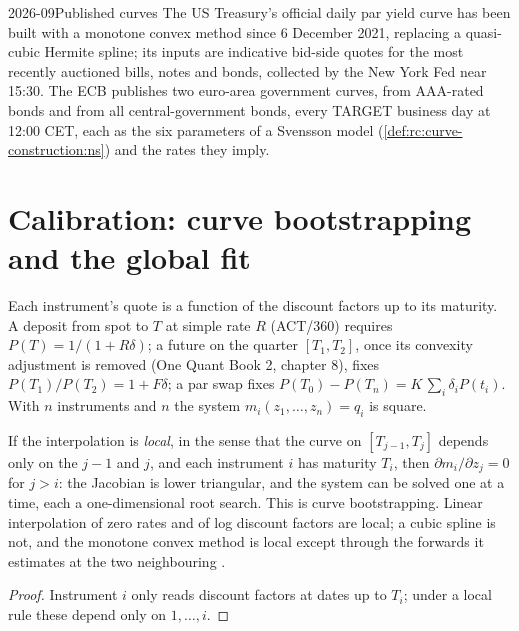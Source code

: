 \begin{dated}{2026-09}{Published curves}\label{dat:rc:curve-construction:published}
The US Treasury's official daily par yield curve has been built with a
monotone convex method since 6 December 2021, replacing a quasi-cubic Hermite
spline; its inputs are indicative bid-side quotes for the most recently
auctioned bills, notes and bonds, collected by the New York Fed near 15:30.
The ECB publishes two euro-area government curves, from AAA-rated bonds and
from all central-government bonds, every TARGET business day at 12:00 CET,
each as the six parameters of a Svensson model
(\cref{def:rc:curve-construction:ns}) and the rates they imply.
\end{dated}

\section{Calibration: curve bootstrapping and the global fit}

Each instrument's quote is a function of the discount factors up to its
maturity. A deposit from spot to $T$ at simple rate $R$ (ACT/360) requires
$P(T) = 1/(1+R\delta)$; a future on the quarter $[T_1,T_2]$, once its
convexity adjustment is removed (One Quant Book 2, chapter 8), fixes
$P(T_1)/P(T_2) = 1+F\delta$; a par swap fixes $P(T_0)-P(T_n)=K\,\sum_i
\delta_iP(t_i)$. With $n$ instruments and $n$  the system
$m_i(z_1,\dots,z_n)=q_i$ is square.

\begin{proposition}\label{prop:rc:curve-construction:triangular}
If the interpolation is \emph{local}, in the sense that the curve on
$[T_{j-1},T_j]$ depends only on the  $j-1$ and $j$, and each instrument
$i$ has maturity $T_i$, then $\partial m_i/\partial z_j = 0$ for $j>i$: the
Jacobian is lower triangular, and the system can be solved one  at a
time, each a one-dimensional root search. This is curve bootstrapping. Linear
interpolation of zero rates and of log discount factors are local; a cubic
spline is not, and the monotone convex method is local except through the
forwards it estimates at the two neighbouring .
\end{proposition}
\begin{proof}
Instrument $i$ only reads discount factors at dates up to $T_i$; under a local
rule these depend only on  $1,\dots,i$.
\end{proof}

